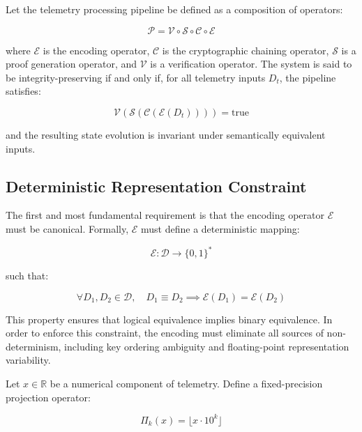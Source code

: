 Let the telemetry processing pipeline be defined as a composition of operators:

\begin{equation}
\mathcal{P} = \mathcal{V} \circ \mathcal{S} \circ \mathcal{C} \circ \mathcal{E}
\end{equation}

where $\mathcal{E}$ is the encoding operator, $\mathcal{C}$ is the cryptographic chaining operator, $\mathcal{S}$ is a proof generation operator, and $\mathcal{V}$ is a verification operator. The system is said to be integrity-preserving if and only if, for all telemetry inputs $D_t$, the pipeline satisfies:

\begin{equation}
\mathcal{V}(\mathcal{S}(\mathcal{C}(\mathcal{E}(D_t)))) = \text{true}
\end{equation}

and the resulting state evolution is invariant under semantically equivalent inputs.

\subsection{Deterministic Representation Constraint}

The first and most fundamental requirement is that the encoding operator $\mathcal{E}$ must be canonical. Formally, $\mathcal{E}$ must define a deterministic mapping:

\begin{equation}
\mathcal{E}: \mathcal{D} \rightarrow \{0,1\}^*
\end{equation}

such that:

\begin{equation}
\forall D_1, D_2 \in \mathcal{D}, \quad D_1 \equiv D_2 \implies \mathcal{E}(D_1) = \mathcal{E}(D_2)
\end{equation}

This property ensures that logical equivalence implies binary equivalence. In order to enforce this constraint, the encoding must eliminate all sources of non-determinism, including key ordering ambiguity and floating-point representation variability.

Let $x \in \mathbb{R}$ be a numerical component of telemetry. Define a fixed-precision projection operator:

\begin{equation}
\Pi_k(x) = \lfloor x \cdot 10^k \rfloor
\end{equation}

